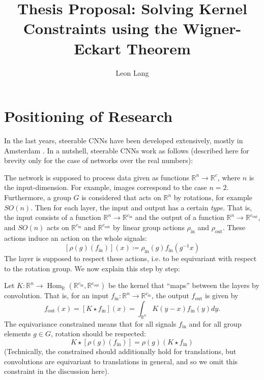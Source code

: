 \documentclass[12pt, a4paper]{article}
\title{Thesis Proposal: Solving Kernel Constraints using the Wigner-Eckart Theorem}
\date{}
\author{Leon Lang}
\theoremstyle{plain}
\theoremstyle{definition}
\theoremstyle{remark}
\newcommand{\R}{\mathds{R}}
\DeclareMathOperator{\Hom}{Hom}
\DeclareMathOperator{\inn}{in}
\DeclareMathOperator{\out}{out}
\begin{document}
\maketitle

\tableofcontents

\section{Positioning of Research}

In the last years, steerable CNNs have been developed extensively, mostly in Amsterdam \cite{cohen2016steerable}  \cite{general_theory} \cite{3d_cnns} \cite{gauge_cnns} \cite{general_e2_cnns}. In a nutshell, steerable CNNs work as follows (described here for brevity only for the case of networks over the real numbers):

The network is supposed to process data given as functions $\R^n \to \R^{c}$, where $n$ is the input-dimension. For example, images correspond to the case $n = 2$. Furthermore, a group $G$ is considered that acts on $\R^n$ by rotations, for example $SO(n)$. Then for each layer, the input and output has a certain \emph{type}. That is, the input consists of a function $\R^n \to \R^{c_{\inn}}$ and the output of a function $\R^n \to \R^{c_{\out}}$, and $SO(n)$ acts on $\R^{c_{\inn}}$ and $\R^{c_{\out}}$ by linear group actions $\rho_{\inn}$ and $\rho_{\out}$. These actions induce an action on the whole signals:
\begin{equation*}
\left[ \rho(g)(f_{\inn})\right](x) \coloneq \rho_{\inn}(g) f_{\inn} (g^{-1}x)
\end{equation*}
The layer is supposed to respect these actions, i.e. to be equivariant with respect to the rotation group. We now explain this step by step:

Let $K: \R^n \to \Hom_{\R}(\R^{c_{\inn}}, \R^{c_{\out}})$ be the kernel that ``maps'' between the layers by convolution. That is, for an input $f_{\inn}: \R^{n} \to \R^{c_{\inn}}$, the output $f_{\out}$ is given by
\begin{equation*}
f_{\out}(x) = \left[ K \star f_{\inn}\right](x) = \int_{\R^n} K(y - x) f_{\inn}(y) dy.
\end{equation*}
The equivariance constrained means that for all signals $f_{\inn}$ and for all group elements $g \in G$, rotation should be respected:
\begin{equation*}
K \star \left[ \rho(g)(f_{\inn}) \right] = \rho(g) \left( K \star f_{\inn} \right)
\end{equation*}
(Technically, the constrained should additionally hold for translations, but convolutions are equivariant to translations in general, and so we omit this constraint in the discussion here).
\end{document}

